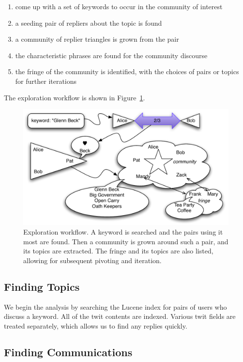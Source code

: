 \begin{enumerate}
	\item come up with a set of keywords to occur in the community of interest
	\item a seeding pair of repliers about the topic is found
	\item a community of replier triangles is grown from the pair
	\item the characteristic phrases are found for the community discourse
	\item the fringe of the community is identified, with the choices of pairs or topics for further iterations
\end{enumerate}

The exploration workflow is shown in Figure~\ref{figure:workflow}.  

\begin{figure}[htp]
\includegraphics{figures/spie-workflow}
\caption{Exploration workflow.  A keyword is searched and the pairs using it most are found.  Then a community is grown around such a pair, and its topics are extracted.  The fringe and its topics are also listed, allowing for subsequent pivoting and iteration.}
\label{figure:workflow}
\end{figure}
	
\subsection{Finding Topics}

We begin the analysis by searching the Lucene index for pairs of users who discuss a keyword.  All of the twit contents are indexed.  Various twit fields are treated separately, which allows us to find any replies quickly.

\subsection{Finding Communications}

